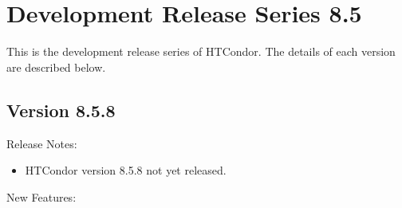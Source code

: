 
\section{\label{sec:History-8-5}Development Release Series 8.5}

This is the development release series of HTCondor.
The details of each version are described below.

\subsection*{\label{sec:New-8-5-8}Version 8.5.8}

\noindent Release Notes:

\begin{itemize}

\item HTCondor version 8.5.8 not yet released.

\end{itemize}

\noindent New Features:

